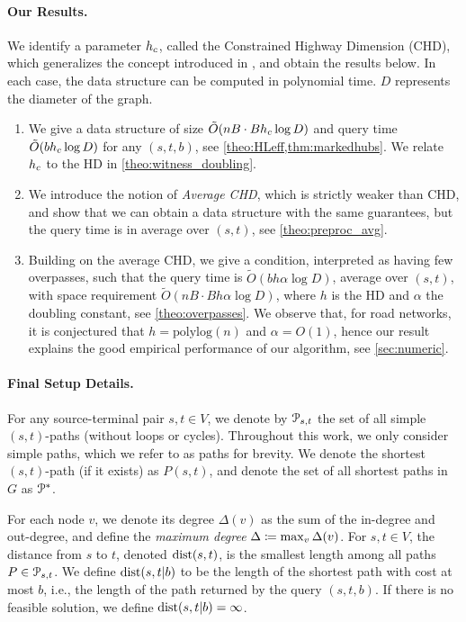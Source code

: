 \paragraph{Our Results.}
We identify a parameter $h_c$, called the Constrained Highway Dimension (CHD), which generalizes the concept introduced in \citep{hd_journal}, and obtain the results below.
In each case, the data structure can be computed in polynomial time.
$D$ represents the diameter of the graph.
\begin{enumerate}
\item We give a data structure of size $\tilde O(nB\cdot Bh_c\log D)$ and query time $\tilde O(bh_c\log D)$ for any $(s,t,b)$, see \cref{theo:HLeff,thm:markedhubs}.
We relate $h_c$ to the HD in \cref{theo:witness_doubling}.
\item We introduce the notion of \emph{Average CHD}, which is strictly weaker than CHD, and show that we can obtain a data structure with the same guarantees, but the query time is in average over $(s,t)$, see \cref{theo:preproc_avg}.
\item Building on the average CHD, we give a condition, interpreted as having few overpasses, such that the query time is  $\tilde O(bh\alpha\log D)$, average over $(s,t)$, with space requirement $\tilde O(n B\cdot Bh\alpha\log D)$, where $h$ is the HD and $\alpha$ the doubling constant, see \cref{theo:overpasses}.
We observe that, for road networks, it is conjectured that $h=\text{polylog}(n)$ and $\alpha=O(1)$, hence our result explains the good empirical performance of our algorithm, see \cref{sec:numeric}.
\end{enumerate}


\medskip
\paragraph{Final Setup Details.}
For any source-terminal pair $s,t\in V$, we denote by $\mathcal{P}_{s,t}$ the set of all simple $(s,t)$-paths (without loops or cycles). 
Throughout this work, we only consider simple paths, which we refer to as paths for brevity.
We denote the shortest $(s,t)$-path (if it exists) as $P(s,t)$, and denote the set of all shortest paths in $G$ as $\mathcal{P}^*$.

For each node $v$, we denote its degree $\Delta(v)$ as the sum of the in-degree and out-degree, and define the \emph{maximum degree} $\Delta \coloneqq \max_v\Delta(v)$.
For $s,t\in V$, the distance from $s$ to $t$, denoted $\mbox{dist}(s,t)$, is the smallest length among all paths $P\in\mathcal{P}_{s,t}$.
We define $\mbox{dist}(s,t|b)$ to be the length of the shortest path with cost at most $b$, i.e., the length of the path returned by the query $(s,t,b)$.
If there is no feasible solution, we define $\mbox{dist}(s,t|b)=\infty$.

